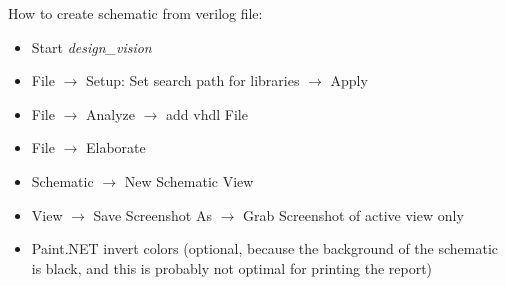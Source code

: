 How to create schematic from verilog file: 
\begin{itemize}
\item Start \emph{design\_vision}
\item File $\rightarrow$ Setup: Set search path for libraries $\rightarrow$ 
Apply 
\item File $\rightarrow$ Analyze $\rightarrow$ add vhdl File 
\item File $\rightarrow$ Elaborate 
\item Schematic $\rightarrow$ New Schematic View 
\item View $\rightarrow$ Save Screenshot As $\rightarrow$ Grab Screenshot of 
active view only 
\item Paint.NET invert colors (optional, because the background of the 
schematic is black, and this is probably not optimal for printing the report)
\end{itemize}

